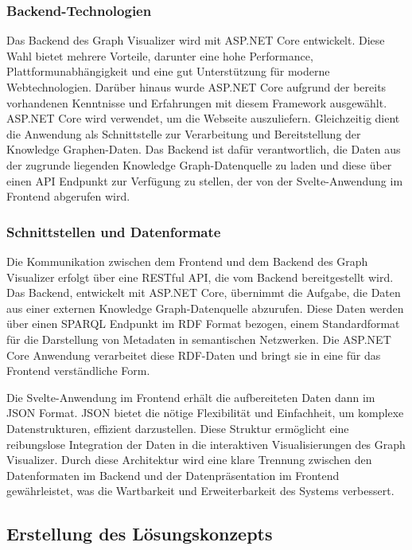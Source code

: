 \subsubsection{Backend-Technologien}

Das Backend des Graph Visualizer wird mit ASP.NET Core entwickelt. Diese Wahl bietet mehrere Vorteile, darunter eine hohe Performance, Plattformunabhängigkeit und eine gut Unterstützung für moderne Webtechnologien. Darüber hinaus wurde ASP.NET Core aufgrund der bereits vorhandenen Kenntnisse und Erfahrungen mit diesem Framework ausgewählt. ASP.NET Core wird verwendet, um die Webseite auszuliefern. Gleichzeitig dient die Anwendung als Schnittstelle zur Verarbeitung und Bereitstellung der Knowledge Graphen-Daten. Das Backend ist dafür verantwortlich, die Daten aus der zugrunde liegenden Knowledge Graph-Datenquelle zu laden und diese über einen \ac{API} Endpunkt zur Verfügung zu stellen, der von der Svelte-Anwendung im Frontend abgerufen wird.

\subsubsection{Schnittstellen und Datenformate}

Die Kommunikation zwischen dem Frontend und dem Backend des Graph Visualizer erfolgt über eine RESTful \acs{API}, die vom Backend bereitgestellt wird. Das Backend, entwickelt mit ASP.NET Core, übernimmt die Aufgabe, die Daten aus einer externen Knowledge Graph-Datenquelle abzurufen. Diese Daten werden über einen \ac{SPARQL} Endpunkt im \ac{RDF} Format bezogen, einem Standardformat für die Darstellung von Metadaten in semantischen Netzwerken. Die ASP.NET Core Anwendung verarbeitet diese RDF-Daten und bringt sie in eine für das Frontend verständliche Form.

Die Svelte-Anwendung im Frontend erhält die aufbereiteten Daten dann im \ac{JSON} Format. \ac{JSON} bietet die nötige Flexibilität und Einfachheit, um komplexe Datenstrukturen, effizient darzustellen. Diese Struktur ermöglicht eine reibungslose Integration der Daten in die interaktiven Visualisierungen des Graph Visualizer. Durch diese Architektur wird eine klare Trennung zwischen den Datenformaten im Backend und der Datenpräsentation im Frontend gewährleistet, was die Wartbarkeit und Erweiterbarkeit des Systems verbessert.

\subsection{Erstellung des Lösungskonzepts}

